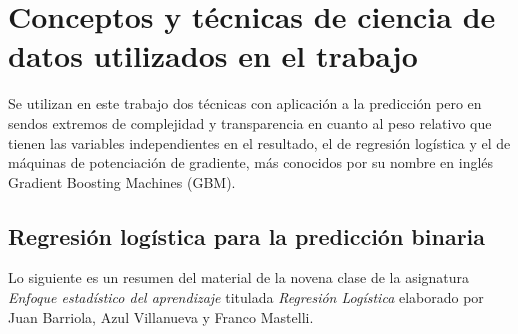 \documentclass[a4paper]{report}
\begin{document}





\section{Conceptos y técnicas de ciencia de datos utilizados en el trabajo}


Se utilizan en este trabajo dos técnicas con aplicación a la predicción pero en sendos extremos de complejidad y transparencia en cuanto al peso relativo que tienen las variables independientes en el resultado, el de regresión logística y el de máquinas de potenciación de gradiente, más conocidos por su nombre en inglés Gradient Boosting Machines (GBM).


\subsection{Regresión logística para la predicción binaria}\label{sec:logística}

Lo siguiente es un resumen del material de la novena clase de la asignatura \emph{Enfoque estadístico del aprendizaje} titulada \emph{Regresión Logística} elaborado por Juan Barriola, Azul Villanueva y Franco Mastelli. 
\end{document}
